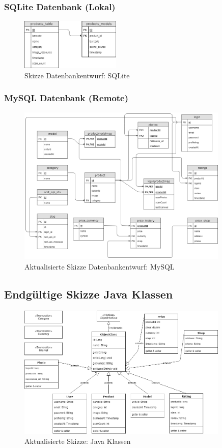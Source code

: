 \documentclass{scrartcl}
\begin{document}
\subsubsection{SQLite Datenbank (Lokal)}

\begin{figure}[h]
\centering
\includegraphics[width=180px]{img/Skizze_Datenbank_SQLite.png}
\caption{Skizze Datenbankentwurf: SQLite}
\end{figure}

\subsubsection{MySQL Datenbank (Remote)}

\begin{figure}[h]
\centering
\includegraphics[width=380px]{img/Skizze_Datenbank_2.png}
\caption{Aktualisierte Skizze Datenbankentwurf: MySQL}
\end{figure}

\newpage

\subsection{Endgültige Skizze Java Klassen}

\begin{figure}[h]
\centering
\includegraphics[width=380px]{img/Skizze_Java_New.png}
\caption{Aktualisierte Skizze: Java Klassen}
\end{figure}
\end{document}

